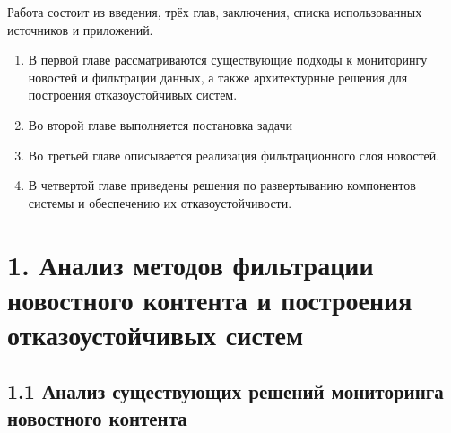 Работа состоит из введения, трёх глав, заключения, списка использованных
источников и приложений.

\begin{enumerate}
\def\labelenumi{\arabic{enumi}.}
\tightlist
\item
  В первой главе рассматриваются существующие подходы к мониторингу
  новостей и фильтрации данных, а также архитектурные решения для
  построения отказоустойчивых систем.\\
\item
  Во второй главе выполняется постановка задачи\\
\item
  Во третьей главе описывается реализация фильтрационного слоя
  новостей.\\
\item
  В четвертой главе приведены решения по развертыванию компонентов
  системы и обеспечению их отказоустойчивости.
\end{enumerate}

\hypertarget{ux430ux43dux430ux43bux438ux437-ux43cux435ux442ux43eux434ux43eux432-ux444ux438ux43bux44cux442ux440ux430ux446ux438ux438-ux43dux43eux432ux43eux441ux442ux43dux43eux433ux43e-ux43aux43eux43dux442ux435ux43dux442ux430-ux438-ux43fux43eux441ux442ux440ux43eux435ux43dux438ux44f-ux43eux442ux43aux430ux437ux43eux443ux441ux442ux43eux439ux447ux438ux432ux44bux445-ux441ux438ux441ux442ux435ux43c}{%
\section{1. Анализ методов фильтрации новостного контента и построения
отказоустойчивых
систем}\label{ux430ux43dux430ux43bux438ux437-ux43cux435ux442ux43eux434ux43eux432-ux444ux438ux43bux44cux442ux440ux430ux446ux438ux438-ux43dux43eux432ux43eux441ux442ux43dux43eux433ux43e-ux43aux43eux43dux442ux435ux43dux442ux430-ux438-ux43fux43eux441ux442ux440ux43eux435ux43dux438ux44f-ux43eux442ux43aux430ux437ux43eux443ux441ux442ux43eux439ux447ux438ux432ux44bux445-ux441ux438ux441ux442ux435ux43c}}

\hypertarget{ux430ux43dux430ux43bux438ux437-ux441ux443ux449ux435ux441ux442ux432ux443ux44eux449ux438ux445-ux440ux435ux448ux435ux43dux438ux439-ux43cux43eux43dux438ux442ux43eux440ux438ux43dux433ux430-ux43dux43eux432ux43eux441ux442ux43dux43eux433ux43e-ux43aux43eux43dux442ux435ux43dux442ux430}{%
\subsection{1.1 Анализ существующих решений мониторинга новостного
контента}\label{ux430ux43dux430ux43bux438ux437-ux441ux443ux449ux435ux441ux442ux432ux443ux44eux449ux438ux445-ux440ux435ux448ux435ux43dux438ux439-ux43cux43eux43dux438ux442ux43eux440ux438ux43dux433ux430-ux43dux43eux432ux43eux441ux442ux43dux43eux433ux43e-ux43aux43eux43dux442ux435ux43dux442ux430}}

